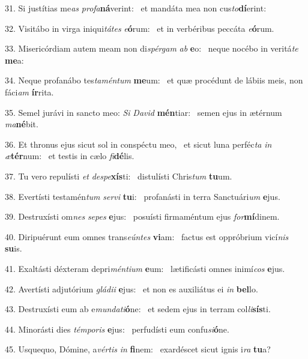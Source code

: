 31. Si justítias me\textit{as} \textit{pro}\textit{fa}\textbf{ná}verint: \ast\  et mandáta mea non cus\textit{to}\textbf{dí}erint:\

32. Visitábo in virga iniqui\textit{tá}\textit{tes} \textit{e}\textbf{ó}rum: \ast\  et in verbéribus peccáta \textit{e}\textbf{ó}rum.\

33. Misericórdiam autem meam non di\textit{spér}\textit{gam} \textit{ab} \textbf{e}o: \ast\  neque nocébo in veritá\textit{te} \textbf{me}a:\

34. Neque profanábo tes\textit{ta}\textit{mén}\textit{tum} \textbf{me}um: \ast\  et quæ procédunt de lábiis meis, non fáci\textit{am} \textbf{ír}rita.\

35. Semel jurávi in sancto meo: \textit{Si} \textit{Da}\textit{vid} \textbf{mén}tiar: \ast\  semen ejus in ætérnum \textit{ma}\textbf{né}bit.\

36. Et thronus ejus sicut sol in conspéctu meo, \dag\  et sicut luna perféc\textit{ta} \textit{in} \textit{æ}\textbf{tér}num: \ast\  et testis in cælo \textit{fi}\textbf{dé}lis.\

37. Tu vero repulísti \textit{et} \textit{de}\textit{spe}\textbf{xís}ti: \ast\  distulísti Chris\textit{tum} \textbf{tu}um.\

38. Evertísti testamén\textit{tum} \textit{ser}\textit{vi} \textbf{tu}i: \ast\  profanásti in terra Sanctuári\textit{um} \textbf{e}jus.\

39. Destruxísti om\textit{nes} \textit{se}\textit{pes} \textbf{e}jus: \ast\  posuísti firmaméntum ejus \textit{for}\textbf{mí}dinem.\

40. Diripuérunt eum omnes trans\textit{e}\textit{ún}\textit{tes} \textbf{vi}am: \ast\  factus est oppróbrium vicí\textit{nis} \textbf{su}is.\

41. Exaltásti déxteram depri\textit{mén}\textit{ti}\textit{um} \textbf{e}um: \ast\  lætificásti omnes inimí\textit{cos} \textbf{e}jus.\

42. Avertísti adjutórium \textit{glá}\textit{di}\textit{i} \textbf{e}jus: \ast\  et non es auxiliátus ei \textit{in} \textbf{bel}lo.\

43. Destruxísti eum ab e\textit{mun}\textit{da}\textit{ti}\textbf{ó}ne: \ast\  et sedem ejus in terram col\textit{li}\textbf{sís}ti.\

44. Minorásti dies \textit{tém}\textit{po}\textit{ris} \textbf{e}jus: \ast\  perfudísti eum confu\textit{si}\textbf{ó}ne.\

45. Usquequo, Dómine, a\textit{vér}\textit{tis} \textit{in} \textbf{fi}nem: \ast\  exardéscet sicut ignis i\textit{ra} \textbf{tu}a?\

